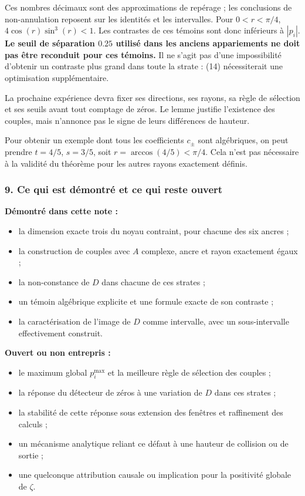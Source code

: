 \documentclass[
  10pt,
  a4paper,
]{article}
\providecommand{\tightlist}{%
  \setlength{\itemsep}{0pt}\setlength{\parskip}{0pt}}
\begin{document}
Ces nombres décimaux sont des approximations de repérage ; les
conclusions de non-annulation reposent sur les identités et les
intervalles. Pour \(0<r<\pi/4\), \(4\cos(r)\sin^3(r)<1\). Les contrastes
de ces témoins sont donc inférieurs à \(|p_i|\). \textbf{Le seuil de
séparation \(0.25\) utilisé dans les anciens appariements ne doit pas
être reconduit pour ces témoins.} Il ne s'agit pas d'une impossibilité
d'obtenir un contraste plus grand dans toute la strate : (14)
nécessiterait une optimisation supplémentaire.

La prochaine expérience devra fixer ses directions, ses rayons, sa règle
de sélection et ses seuils avant tout comptage de zéros. Le lemme
justifie l'existence des couples, mais n'annonce pas le signe de leurs
différences de hauteur.

Pour obtenir un exemple dont tous les coefficients \(c_\pm\) sont
algébriques, on peut prendre \(t=4/5\), \(s=3/5\), soit
\(r=\arccos(4/5)<\pi/4\). Cela n'est pas nécessaire à la validité du
théorème pour les autres rayons exactement définis.

\hypertarget{ce-qui-est-duxe9montruxe9-et-ce-qui-reste-ouvert}{%
\subsubsection{9. Ce qui est démontré et ce qui reste
ouvert}\label{ce-qui-est-duxe9montruxe9-et-ce-qui-reste-ouvert}}

\textbf{Démontré dans cette note :}

\begin{itemize}
\tightlist
\item
  la dimension exacte trois du noyau contraint, pour chacune des six
  ancres ;
\item
  la construction de couples avec \(A\) complexe, ancre et rayon
  exactement égaux ;
\item
  la non-constance de \(D\) dans chacune de ces strates ;
\item
  un témoin algébrique explicite et une formule exacte de son contraste
  ;
\item
  la caractérisation de l'image de \(D\) comme intervalle, avec un
  sous-intervalle effectivement construit.
\end{itemize}

\textbf{Ouvert ou non entrepris :}

\begin{itemize}
\tightlist
\item
  le maximum global \(p_i^{\max}\) et la meilleure règle de sélection
  des couples ;
\item
  la réponse du détecteur de zéros à une variation de \(D\) dans ces
  strates ;
\item
  la stabilité de cette réponse sous extension des fenêtres et
  raffinement des calculs ;
\item
  un mécanisme analytique reliant ce défaut à une hauteur de collision
  ou de sortie ;
\item
  une quelconque attribution causale ou implication pour la positivité
  globale de \(\zeta\).
\end{itemize}
\end{document}

